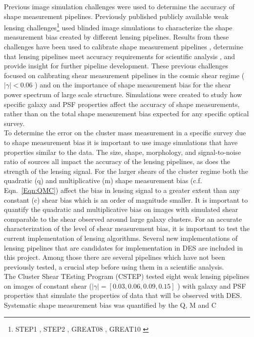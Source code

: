 \documentclass[useAMS,usenatbib]{mn2e}
\begin{document}
\indent Previous image simulation challenges were used to determine the accuracy of shape measurement pipelines. 
Previously published publicly available weak lensing challenges\footnote{STEP1 \citep{STEP1},
STEP2 \citep{STEP2}, GREAT08 \citep{GREAT08}, GREAT10
\citep{GREAT10}} used blinded image
simulations to characterize the shape measurement bias created by
different lensing pipelines. Results from these challenges have been
used to calibrate shape measurement pipelines \citep[e.g.][]{Apple}, determine
that lensing pipelines meet accuracy requirements for scientific
analysis \citep[e.g.][]{Berge}, and provide insight for further pipeline
development. These previous challenges focused on calibrating shear
measurement pipelines in the cosmic shear regime ( $| \gamma | < 0.06$
) and on the importance of shape measurement bias for the shear power
spectrum of large scale structure. Simulations
were created to study how specific galaxy and PSF properties affect the accuracy of 
shape measurements, rather than on the total shape measurement bias expected for any specific 
optical survey. \\
\indent To determine the error on the cluster mass measurement in a
specific survey due to shape measurement bias it is important to use
image simulations that have properties similar to the data. 
The size, shape, morphology, and signal-to-noise ratio of sources all impact the accuracy of the 
lensing pipelines, as does the strength of the lensing signal. For the
larger shears of the cluster regime both the quadratic (q) and
multiplicative (m) shape measurement bias (c.f. Eqn.~\ref{Eqn:QMC})
affect the bias in lensing signal to a greater extent than any
constant (c) shear bias which is an order of magnitude smaller. It is
important to quantify the quadratic and multiplicative bias on images
with simulated shear comparable to the shear observed around large
galaxy clusters. For an accurate characterization of the level of shear measurement bias, it is important to test the current implementation of lensing algorithms. Several new implementations
of lensing pipelines that are candidates for implementation
in DES are included in this project. Among those there are several
pipelines which have not been previously tested, a crucial step 
before using them in a scientific analysis. \\
\indent The Cluster Shear TEsting Program (CSTEP) tested eight weak lensing pipelines on images of constant shear
($|\gamma| = [0.03, 0.06, 0.09, 0.15]$ ) with galaxy and PSF properties that simulate the properties
of data that will be observed with DES. Systematic shape measurement bias was quantified by the Q, M and C
\end{document}
